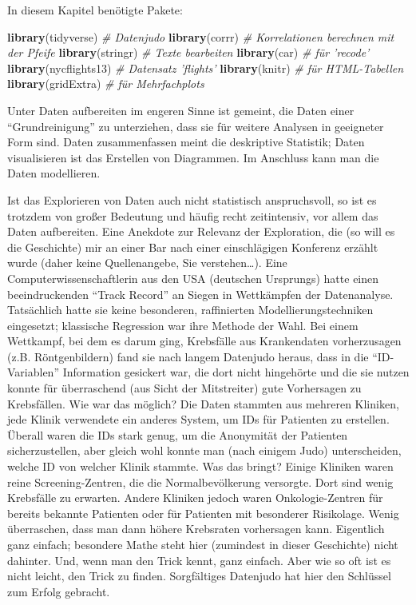 \documentclass[12pt,]{book}
\makeatletter
\newenvironment{Shaded}{\begin{snugshade}}{\end{snugshade}}
\newcommand{\KeywordTok}[1]{\textcolor[rgb]{0.13,0.29,0.53}{\textbf{{#1}}}}
\newcommand{\CommentTok}[1]{\textcolor[rgb]{0.56,0.35,0.01}{\textit{{#1}}}}
\newcommand{\NormalTok}[1]{{#1}}
\newenvironment{kframe}{%
\medskip{}
\setlength{\fboxsep}{.8em}
 \def\at@end@of@kframe{}%
 \ifinner\ifhmode%
  \def\at@end@of@kframe{\end{minipage}}%
  \begin{minipage}{\columnwidth}%
 \fi\fi%
 \def\FrameCommand##1{\hskip\@totalleftmargin \hskip-\fboxsep
 \colorbox{shadecolor}{##1}\hskip-\fboxsep
     \hskip-\linewidth \hskip-\@totalleftmargin \hskip\columnwidth}%
 \MakeFramed {\advance\hsize-\width
   \@totalleftmargin\z@ \linewidth\hsize
   \@setminipage}}%
 {\par\unskip\endMakeFramed%
 \at@end@of@kframe}
\renewenvironment{Shaded}{\begin{kframe}}{\end{kframe}}
\makeatother
\begin{document}
In diesem Kapitel benötigte Pakete:

\begin{Shaded}
\begin{Highlighting}[]
\KeywordTok{library}\NormalTok{(tidyverse)  }\CommentTok{# Datenjudo}
\KeywordTok{library}\NormalTok{(corrr)  }\CommentTok{# Korrelationen berechnen mit der Pfeife}
\KeywordTok{library}\NormalTok{(stringr)   }\CommentTok{# Texte bearbeiten}
\KeywordTok{library}\NormalTok{(car)  }\CommentTok{# für 'recode'}
\KeywordTok{library}\NormalTok{(nycflights13)  }\CommentTok{# Datensatz 'flights'}
\KeywordTok{library}\NormalTok{(knitr)  }\CommentTok{# für HTML-Tabellen}
\KeywordTok{library}\NormalTok{(gridExtra)  }\CommentTok{# für Mehrfachplots}
\end{Highlighting}
\end{Shaded}

Unter Daten aufbereiten im engeren Sinne ist gemeint, die Daten einer
``Grundreinigung'' zu unterziehen, dass sie für weitere Analysen in
geeigneter Form sind. Daten zusammenfassen meint die deskriptive
Statistik; Daten visualisieren ist das Erstellen von Diagrammen. Im
Anschluss kann man die Daten modellieren.

Ist das Explorieren von Daten auch nicht statistisch anspruchsvoll, so
ist es trotzdem von großer Bedeutung und häufig recht zeitintensiv, vor
allem das Daten aufbereiten. Eine Anekdote zur Relevanz der Exploration,
die (so will es die Geschichte) mir an einer Bar nach einer
einschlägigen Konferenz erzählt wurde (daher keine Quellenangebe, Sie
verstehen\ldots{}). Eine Computerwissenschaftlerin aus den USA
(deutschen Ursprungs) hatte einen beeindruckenden ``Track Record'' an
Siegen in Wettkämpfen der Datenanalyse. Tatsächlich hatte sie keine
besonderen, raffinierten Modellierungstechniken eingesetzt; klassische
Regression war ihre Methode der Wahl. Bei einem Wettkampf, bei dem es
darum ging, Krebsfälle aus Krankendaten vorherzusagen (z.B.
Röntgenbildern) fand sie nach langem Datenjudo heraus, dass in die
``ID-Variablen'' Information gesickert war, die dort nicht hingehörte
und die sie nutzen konnte für überraschend (aus Sicht der Mitstreiter)
gute Vorhersagen zu Krebsfällen. Wie war das möglich? Die Daten stammten
aus mehreren Kliniken, jede Klinik verwendete ein anderes System, um IDs
für Patienten zu erstellen. Überall waren die IDs stark genug, um die
Anonymität der Patienten sicherzustellen, aber gleich wohl konnte man
(nach einigem Judo) unterscheiden, welche ID von welcher Klinik stammte.
Was das bringt? Einige Kliniken waren reine Screening-Zentren, die die
Normalbevölkerung versorgte. Dort sind wenig Krebsfälle zu erwarten.
Andere Kliniken jedoch waren Onkologie-Zentren für bereits bekannte
Patienten oder für Patienten mit besonderer Risikolage. Wenig
überraschen, dass man dann höhere Krebsraten vorhersagen kann.
Eigentlich ganz einfach; besondere Mathe steht hier (zumindest in dieser
Geschichte) nicht dahinter. Und, wenn man den Trick kennt, ganz einfach.
Aber wie so oft ist es nicht leicht, den Trick zu finden. Sorgfältiges
Datenjudo hat hier den Schlüssel zum Erfolg gebracht.
\end{document}
